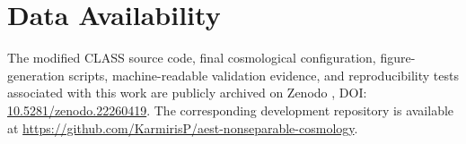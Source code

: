 \section*{Data Availability}

The modified CLASS source code, final cosmological configuration,
figure-generation scripts, machine-readable validation evidence, and
reproducibility tests associated with this work are publicly archived
on Zenodo \cite{Karmiris2026AeSTSoftware}, DOI:
\href{https://doi.org/10.5281/zenodo.22260419}{10.5281/zenodo.22260419}.
The corresponding development repository is available at
\url{https://github.com/KarmirisP/aest-nonseparable-cosmology}.
